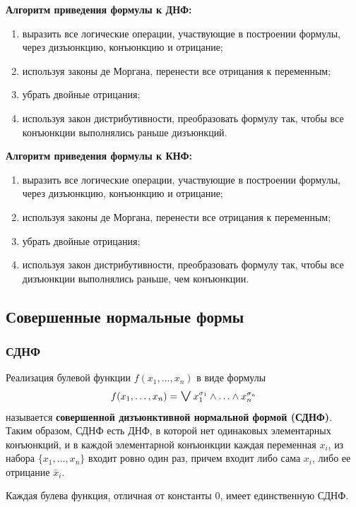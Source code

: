 \noindent \textbf{Алгоритм приведения формулы к ДНФ:}
\begin{enumerate}
    \item выразить все логические операции, участвующие в построении формулы, через дизъюнкцию, конъюнкцию и отрицание;
    \item используя законы де Моргана, перенести все отрицания к переменным;
    \item убрать двойные отрицания;
    \item используя закон дистрибутивности, преобразовать формулу так, чтобы все конъюнкции выполнялись раньше дизъюнкций.
\end{enumerate}

\noindent \textbf{Алгоритм приведения формулы к КНФ:}
\begin{enumerate}
    \item выразить все логические операции, участвующие в построении формулы, через дизъюнкцию, конъюнкцию и отрицание;
    \item используя законы де Моргана, перенести все отрицания к переменным;
    \item убрать двойные отрицания;
    \item используя закон дистрибутивности, преобразовать формулу так, чтобы все дизъюнкции выполнялись раньше, чем конъюнкции.
\end{enumerate}

\subsection{Совершенные нормальные формы}

\subsubsection{СДНФ}

Реализация булевой функции \(f(x_1, \ldots, x_n)\) в виде формулы
\[
    f(x_1, \ldots, x_n) = \biglor x_1^{\sigma_1} \land \ldots \land x_n^{\sigma_n}
\]
называется \textbf{совершенной дизъюнктивной нормальной формой (СДНФ)}. Таким образом, СДНФ есть ДНФ, в которой нет одинаковых элементарных конъюнкций, и в каждой элементарной конъюнкции каждая переменная \(x_i\), из набора \(\{x_1, \ldots, x_n\}\) входит ровно один раз, причем входит либо сама \(x_i\), либо ее отрицание \(\bar{x}_i\).

\begin{theorem*}
    Каждая булева функция, отличная от константы \(0\), имеет единственную СДНФ.
\end{theorem*}


